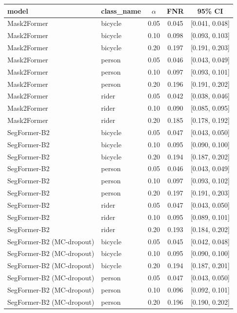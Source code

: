 \begin{table}[t]
\centering
\footnotesize
\setlength{\tabcolsep}{3pt}
\begin{tabular}{llccc}
\toprule
model & class_name & $\alpha$ & FNR & 95\% CI \\
\midrule
Mask2Former & bicycle & 0.05 & 0.045 & [0.041, 0.048] \\
Mask2Former & bicycle & 0.10 & 0.098 & [0.093, 0.103] \\
Mask2Former & bicycle & 0.20 & 0.197 & [0.191, 0.203] \\
Mask2Former & person & 0.05 & 0.046 & [0.043, 0.049] \\
Mask2Former & person & 0.10 & 0.097 & [0.093, 0.101] \\
Mask2Former & person & 0.20 & 0.196 & [0.191, 0.202] \\
Mask2Former & rider & 0.05 & 0.042 & [0.038, 0.046] \\
Mask2Former & rider & 0.10 & 0.090 & [0.085, 0.095] \\
Mask2Former & rider & 0.20 & 0.185 & [0.178, 0.192] \\
SegFormer-B2 & bicycle & 0.05 & 0.047 & [0.043, 0.050] \\
SegFormer-B2 & bicycle & 0.10 & 0.095 & [0.090, 0.100] \\
SegFormer-B2 & bicycle & 0.20 & 0.194 & [0.187, 0.202] \\
SegFormer-B2 & person & 0.05 & 0.046 & [0.043, 0.049] \\
SegFormer-B2 & person & 0.10 & 0.097 & [0.093, 0.102] \\
SegFormer-B2 & person & 0.20 & 0.197 & [0.191, 0.203] \\
SegFormer-B2 & rider & 0.05 & 0.047 & [0.043, 0.050] \\
SegFormer-B2 & rider & 0.10 & 0.095 & [0.089, 0.101] \\
SegFormer-B2 & rider & 0.20 & 0.193 & [0.184, 0.202] \\
SegFormer-B2 (MC-dropout) & bicycle & 0.05 & 0.045 & [0.042, 0.048] \\
SegFormer-B2 (MC-dropout) & bicycle & 0.10 & 0.095 & [0.090, 0.100] \\
SegFormer-B2 (MC-dropout) & bicycle & 0.20 & 0.194 & [0.187, 0.201] \\
SegFormer-B2 (MC-dropout) & person & 0.05 & 0.047 & [0.043, 0.050] \\
SegFormer-B2 (MC-dropout) & person & 0.10 & 0.096 & [0.092, 0.101] \\
SegFormer-B2 (MC-dropout) & person & 0.20 & 0.196 & [0.190, 0.202] \\

\end{tabular}
\end{table}
